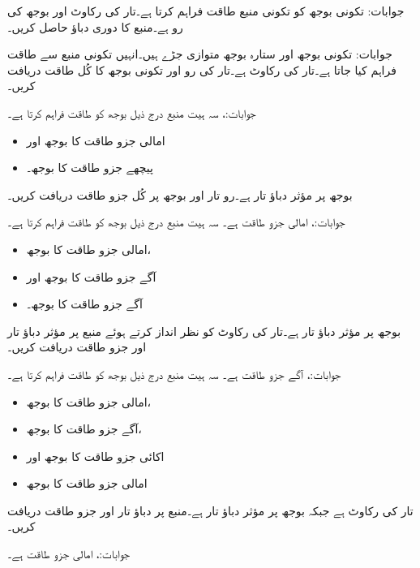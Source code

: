 جوابات:
تکونی بوجھ  کو تکونی  منبع طاقت فراہم  کرتا ہے۔تار کی رکاوٹ  اور بوجھ کی رو 
  ہے۔منبع کا دوری دباؤ حاصل کریں۔

جوابات:
تکونی بوجھ   اور ستارہ بوجھ  متوازی جڑے ہیں۔انہیں تکونی منبع  سے طاقت فراہم کیا جاتا ہے۔تار کی رکاوٹ  ہے۔تار کی رو اور تکونی بوجھ کا کُل طاقت دریافت کریں۔

جوابات:، 
سہ ہیت  منبع درج ذیل بوجھ کو طاقت فراہم کرتا ہے۔
\begin{itemize}
\item
{} امالی جزو طاقت کا  بوجھ اور
\item
{} پیچھے جزو طاقت کا  بوجھ۔
\end{itemize}
بوجھ پر مؤثر دباؤ تار  ہے۔رو تار اور بوجھ پر کُل جزو طاقت دریافت کریں۔

جوابات:، امالی جزو طاقت  ہے۔
سہ ہیت  منبع درج ذیل بوجھ کو طاقت فراہم کرتا ہے۔
\begin{itemize}
\item
{} امالی جزو طاقت کا  بوجھ،
\item
{} آگے جزو طاقت کا  بوجھ اور
\item
{} آگے جزو طاقت کا  بوجھ۔
\end{itemize}
بوجھ پر مؤثر دباؤ تار  ہے۔تار کی رکاوٹ کو نظر انداز کرتے ہوئے منبع پر مؤثر دباؤ تار اور جزو طاقت دریافت کریں۔

جوابات:، آگے جزو طاقت  ہے۔
سہ ہیت  منبع درج ذیل بوجھ کو طاقت فراہم کرتا ہے۔
\begin{itemize}
\item
{} امالی جزو طاقت کا  بوجھ،
\item
{} آگے جزو طاقت کا  بوجھ،
\item
اکائی جزو طاقت کا  بوجھ اور
\item
{} امالی جزو طاقت کا  بوجھ
\end{itemize}
تار کی رکاوٹ  ہے جبکہ بوجھ پر مؤثر دباؤ تار  ہے۔منبع پر دباؤ تار اور جزو طاقت دریافت کریں۔

جوابات:، امالی جزو طاقت  ہے۔

